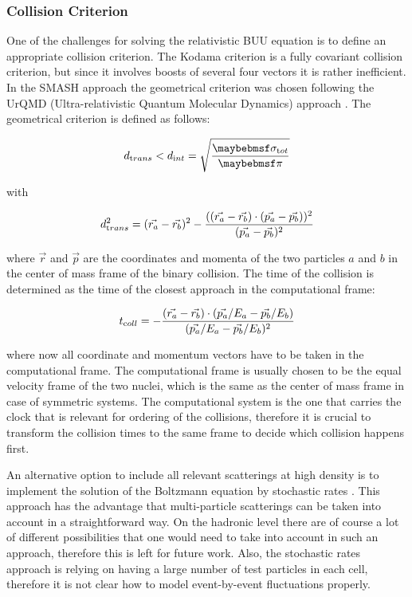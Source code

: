 \subsubsection{Collision Criterion}

One of the challenges for solving the relativistic BUU equation is to define an
appropriate collision criterion. The Kodama criterion \cite{Kodama:1983yk} is a
fully covariant collision criterion, but since it involves boosts of several
four vectors it is rather inefficient.  In the SMASH approach the geometrical
criterion was chosen following the UrQMD (Ultra-relativistic Quantum Molecular
Dynamics) approach \cite{Bass:1998ca}. The geometrical criterion is defined as
follows:

\begin{equation} \label{eq:collision_criterion}
  d_{\textrm trans} < d_{\textrm int} = \sqrt{\frac{\sigma_{\textrm tot}}{\pi}}
\end{equation}

with

\begin{equation}
  d_{\textrm trans}^2 = (\vec{r_a}-\vec{r_b})^2 -
  \frac{((\vec{r_a}-\vec{r_b})\cdot(\vec{p_a}-\vec{p_b}))^2}{(\vec{p_a}-\vec{p_b})^2}
\end{equation}

where $\vec{r}$ and $\vec{p}$ are the coordinates and momenta of the two
particles $a$ and $b$ in the center of mass frame of the binary collision. The
time of the collision is determined as the time of the closest approach in the
computational frame:

\begin{equation} \label{eq:collision_time}
  t_{\textrm coll} = -\frac{(\vec{r_a}-\vec{r_b})\cdot (\vec{p_a}/E_a-\vec{p_b}/E_b)}
                       {(\vec{p_a}/E_a-\vec{p_b}/E_b)^2}
\end{equation}

where now all coordinate and momentum vectors have to be taken in the
computational frame. The computational frame is usually chosen to be the equal
velocity frame of the two nuclei, which is the same as the center of mass frame
in case of symmetric systems. The computational system is the one that carries
the clock that is relevant for ordering of the collisions, therefore it is
crucial to transform the collision times to the same frame to decide which
collision happens first.

An alternative option to include all relevant scatterings at high density is to
implement the solution of the Boltzmann equation by stochastic rates
\cite{Danielewicz:1991dh,Cassing:2001ds,Xu:2004mz}. This approach has the
advantage that multi-particle scatterings can be taken into account in a
straightforward way. On the hadronic level there are of course a lot of
different possibilities that one would need to take into account in such an
approach, therefore this is left for future work. Also, the stochastic rates
approach is relying on having a large number of test particles in each cell,
therefore it is not clear how to model event-by-event fluctuations properly.

